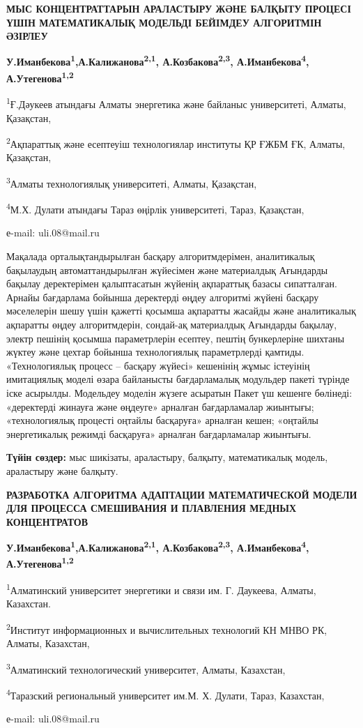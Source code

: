 \begin{center}
{\large\bfseries МЫС КОНЦЕНТРАТТАРЫН АРАЛАСТЫРУ ЖӘНЕ БАЛҚЫТУ ПРОЦЕСІ ҮШІН
МАТЕМАТИКАЛЫҚ МОДЕЛЬДІ БЕЙІМДЕУ АЛГОРИТМІН ӘЗІРЛЕУ}

{\bfseries У.Иманбекова\textsuperscript{1},А.Калижанова\textsuperscript{2,1},
А.Козбакова\textsuperscript{2,3}, А.Иманбекова\textsuperscript{4},
А.Утегенова\textsuperscript{1,2}}

\textsuperscript{1}Ғ.Дәукеев атындағы Алматы энергетика және байланыс
университеті, Алматы, Қазақстан,

\textsuperscript{2}Ақпараттық және есептеуіш технологиялар институты ҚР
ҒЖБМ ҒК, Алматы, Қазақстан,

\textsuperscript{3}Алматы технологиялық университеті, Алматы, Қазақстан,

\textsuperscript{4}М.Х. Дулати атындағы Тараз өңірлік университеті,
Тараз, Қазақстан,

е-mail: uli.08@mail.ru
\end{center}

Мақалада орталықтандырылған басқару алгоритмдерімен, аналитикалық
бақылаудың автоматтандырылған жүйесімен және материалдық Ағындарды
бақылау деректерімен қалыптасатын жүйенің ақпараттық базасы сипатталған.
Арнайы бағдарлама бойынша деректерді өңдеу алгоритмі жүйені басқару
мәселелерін шешу үшін қажетті қосымша ақпаратты жасайды және
аналитикалық ақпаратты өңдеу алгоритмдерін, сондай-ақ материалдық
Ағындарды бақылау, электр пешінің қосымша параметрлерін есептеу, пештің
бункерлеріне шихтаны жүктеу және цехтар бойынша технологиялық
параметрлерді қамтиды. «Технологиялық процесс -- басқару жүйесі»
кешенінің жұмыс істеуінің имитациялық моделі өзара байланысты
бағдарламалық модульдер пакеті түрінде іске асырылды. Модельдеу моделін
жүзеге асыратын Пакет үш кешенге бөлінеді: «деректерді жинауға және
өңдеуге» арналған бағдарламалар жиынтығы; «технологиялық процесті
оңтайлы басқаруға» арналған кешен; «оңтайлы энергетикалық режимді
басқаруға» арналған бағдарламалар жиынтығы.

{\bfseries Түйін сөздер:} мыс шикізаты, араластыру, балқыту, математикалық
модель, араластыру және балқыту.

\begin{center}
{\large\bfseries РАЗРАБОТКА АЛГОРИТМА АДАПТАЦИИ МАТЕМАТИЧЕСКОЙ МОДЕЛИ ДЛЯ
ПРОЦЕССА СМЕШИВАНИЯ И ПЛАВЛЕНИЯ МЕДНЫХ КОНЦЕНТРАТОВ}

{\bfseries У.Иманбекова\textsuperscript{1},А.Калижанова\textsuperscript{2,1},
А.Козбакова\textsuperscript{2,3}, А.Иманбекова\textsuperscript{4},
А.Утегенова\textsuperscript{1,2}}

\textsuperscript{1}Алматинский университет энергетики и связи им. Г.
Даукеева, Алматы, Казахстан.

\textsuperscript{2}Институт информационных и вычислительных технологий
КН МНВО РК, Алматы, Казахстан,

\textsuperscript{3}Алматинский технологический университет, Алматы,
Казахстан,

\textsuperscript{4}Таразский региональный университет им.М. Х. Дулати,
Тараз, Казахстан,

е-mail: uli.08@mail.ru
\end{center}

